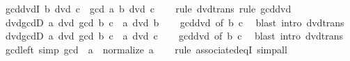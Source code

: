 \begin{isabellebody}
\ gcd{\isacharunderscore}{\kern0pt}dvdI{}{\isacharcolon}{\kern0pt}\ {\isachardoublequoteopen}b\ dvd\ c\ {\isasymLongrightarrow}\ gcd\ a\ b\ dvd\ c{\isachardoublequoteclose}\isanewline
%
\isadelimproof
\ \ %
\endisadelimproof
%
\isatagproof
{}\isamarkupfalse%
\ {\isacharparenleft}{\kern0pt}rule\ dvd{\isacharunderscore}{\kern0pt}trans{\isacharparenright}{\kern0pt}\ {\isacharparenleft}{\kern0pt}rule\ gcd{\isacharunderscore}{\kern0pt}dvd{}{\isacharparenright}{\kern0pt}%
\endisatagproof
{\isafoldproof}%
%
\isadelimproof
\isanewline
%
\endisadelimproof
\isanewline
{}\isamarkupfalse%
\ dvd{\isacharunderscore}{\kern0pt}gcdD{}{\isacharcolon}{\kern0pt}\ {\isachardoublequoteopen}a\ dvd\ gcd\ b\ c\ {\isasymLongrightarrow}\ a\ dvd\ b{\isachardoublequoteclose}\isanewline
%
\isadelimproof
\ \ %
\endisadelimproof
%
\isatagproof
{}\isamarkupfalse%
\ gcd{\isacharunderscore}{\kern0pt}dvd{}\ {\isacharbrackleft}{\kern0pt}of\ b\ c{\isacharbrackright}{\kern0pt}\ \isamarkupfalse%
\ {\isacharparenleft}{\kern0pt}blast\ intro{\isacharcolon}{\kern0pt}\ dvd{\isacharunderscore}{\kern0pt}trans{\isacharparenright}{\kern0pt}%
\endisatagproof
{\isafoldproof}%
%
\isadelimproof
\isanewline
%
\endisadelimproof
\isanewline
{}\isamarkupfalse%
\ dvd{\isacharunderscore}{\kern0pt}gcdD{}{\isacharcolon}{\kern0pt}\ {\isachardoublequoteopen}a\ dvd\ gcd\ b\ c\ {\isasymLongrightarrow}\ a\ dvd\ c{\isachardoublequoteclose}\isanewline
%
\isadelimproof
\ \ %
\endisadelimproof
%
\isatagproof
{}\isamarkupfalse%
\ gcd{\isacharunderscore}{\kern0pt}dvd{}\ {\isacharbrackleft}{\kern0pt}of\ b\ c{\isacharbrackright}{\kern0pt}\ \isamarkupfalse%
\ {\isacharparenleft}{\kern0pt}blast\ intro{\isacharcolon}{\kern0pt}\ dvd{\isacharunderscore}{\kern0pt}trans{\isacharparenright}{\kern0pt}%
\endisatagproof
{\isafoldproof}%
%
\isadelimproof
\isanewline
%
\endisadelimproof
\isanewline
{}\isamarkupfalse%
\ gcd{\isacharunderscore}{\kern0pt}{}{\isacharunderscore}{\kern0pt}left\ {\isacharbrackleft}{\kern0pt}simp{\isacharbrackright}{\kern0pt}{\isacharcolon}{\kern0pt}\ {\isachardoublequoteopen}gcd\ {}\ a\ {\isacharequal}{\kern0pt}\ normalize\ a{\isachardoublequoteclose}\isanewline
%
\isadelimproof
\ \ %
\endisadelimproof
%
\isatagproof
{}\isamarkupfalse%
\ {\isacharparenleft}{\kern0pt}rule\ associated{\isacharunderscore}{\kern0pt}eqI{\isacharparenright}{\kern0pt}\ simp{\isacharunderscore}{\kern0pt}all%
\endisatagproof

\end{isabellebody}
